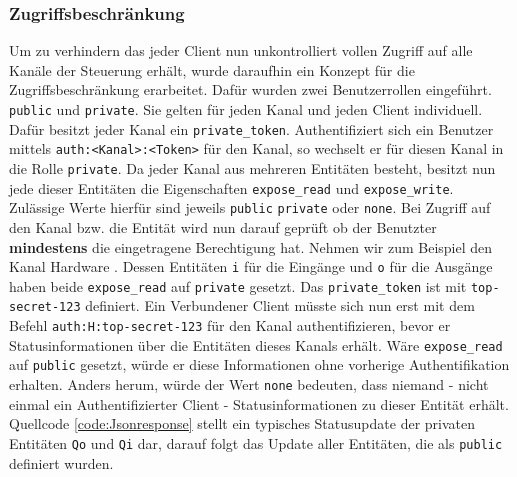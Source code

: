 \subsubsection{Zugriffsbeschränkung}\label{chp:ums:websock:auth}
Um zu verhindern das jeder Client nun unkontrolliert vollen Zugriff auf alle Kanäle der Steuerung erhält, wurde daraufhin ein Konzept für die Zugriffsbeschränkung erarbeitet. Dafür wurden zwei Benutzerrollen eingeführt. \texttt{public} und \texttt{private}. Sie gelten für jeden Kanal und jeden Client individuell. Dafür besitzt jeder Kanal ein \texttt{private\_token}. Authentifiziert sich ein Benutzer mittels \texttt{auth:<Kanal>:<Token>} für den Kanal, so wechselt er für diesen Kanal in die Rolle \texttt{private}. Da jeder Kanal aus mehreren Entitäten besteht, besitzt nun jede dieser Entitäten die Eigenschaften \texttt{expose\_read} und \texttt{expose\_write}. Zulässige Werte hierfür sind jeweils \texttt{public} \texttt{private} oder \texttt{none}. Bei Zugriff auf den Kanal bzw. die Entität wird nun darauf geprüft ob der Benutzter \textbf{mindestens} die eingetragene Berechtigung hat. Nehmen wir zum Beispiel den Kanal Hardware . Dessen Entitäten \texttt{i} für die Eingänge und \texttt{o} für die Ausgänge haben beide \texttt{expose\_read} auf \texttt{private} gesetzt. Das \texttt{private\_token} ist mit \texttt{top-secret-123} definiert. Ein Verbundener Client müsste sich nun erst mit dem Befehl \texttt{auth:H:top-secret-123} für den Kanal authentifizieren, bevor er Statusinformationen über die Entitäten dieses Kanals erhält. Wäre \texttt{expose\_read} auf \texttt{public} gesetzt, würde er diese Informationen ohne vorherige Authentifikation erhalten. Anders herum, würde der Wert \texttt{none} bedeuten, dass niemand - nicht einmal ein Authentifizierter Client - Statusinformationen zu dieser Entität erhält. Quellcode \ref{code:Jsonresponse} stellt ein typisches Statusupdate der privaten Entitäten \texttt{Qo} und \texttt{Qi} dar, darauf folgt das Update aller Entitäten, die als \texttt{public} definiert wurden.  

